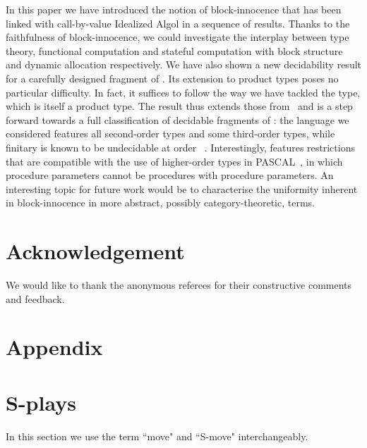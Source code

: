 \documentclass{CSML}
\theoremstyle{definition}\newtheorem{definition}[thm]{Definition}
\theoremstyle{definition}\newtheorem{example}[thm]{Example}
\theoremstyle{definition}\newtheorem{proposition}[thm]{Proposition}
\theoremstyle{definition}\newtheorem{lemma}[thm]{Lemma}
\theoremstyle{definition}\newtheorem{theorem}[thm]{Theorem}
\theoremstyle{definition}\newtheorem{corollary}[thm]{Corollary}
\theoremstyle{definition}\newtheorem{remark}[thm]{Remark}
\begin{document}
In this paper we have introduced the notion of block-innocence that
has been linked with call-by-value Idealized Algol in a sequence of 
results. Thanks to the faithfulness
of block-innocence, we could investigate the interplay between
type theory, functional computation and stateful computation 
with block structure and dynamic allocation respectively. 
We have also shown a new decidability result for a carefully
designed fragment of . Its extension to product types
poses no particular difficulty. In fact, it suffices to follow the way we have tackled
the  type, which is itself a product type.
The result thus extends those from~\cite{Ghi01} and is a step forward
towards a full classification of decidable fragments of :
the language  we considered features all second-order types
and some third-order types, while finitary  is known to be undecidable
at order ~\cite{Mur03b}. Interestingly,  features restrictions that are 
compatible with the use of higher-order types in PASCAL~\cite{Mit02},
in which procedure parameters cannot be procedures with procedure parameters.
An interesting topic for future work would be to characterise the uniformity inherent in block-innocence in more
abstract, possibly category-theoretic, terms.

\section*{Acknowledgement}

We would like to thank the anonymous referees for their constructive comments and feedback.





\appendix
\section*{Appendix}
\section{S-plays}\label{apx:plays}
In this section we use the term ``move" and ``S-move" interchangeably.
\end{document}
